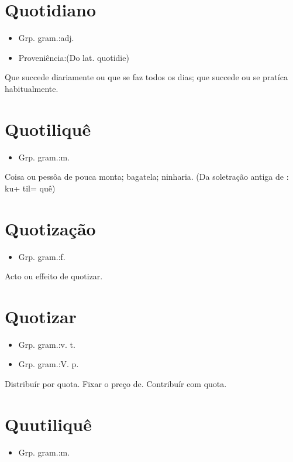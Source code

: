 \section{Quotidiano}
\begin{itemize}
\item {Grp. gram.:adj.}
\end{itemize}
\begin{itemize}
\item {Proveniência:(Do lat. \textunderscore quotidie\textunderscore )}
\end{itemize}
Que succede diariamente ou que se faz todos os dias; que succede ou se pratíca habitualmente.
\section{Quotiliquê}
\begin{itemize}
\item {Grp. gram.:m.}
\end{itemize}
Coisa ou pessôa de pouca monta; bagatela; ninharia.
(Da soletração antiga de \textunderscore [~q]\textunderscore : \textunderscore ku\textunderscore  + \textunderscore til\textunderscore  = \textunderscore quê\textunderscore )
\section{Quotização}
\begin{itemize}
\item {Grp. gram.:f.}
\end{itemize}
Acto ou effeito de quotizar.
\section{Quotizar}
\begin{itemize}
\item {Grp. gram.:v. t.}
\end{itemize}
\begin{itemize}
\item {Grp. gram.:V. p.}
\end{itemize}
Distribuír por quota.
Fixar o preço de.
Contribuír com quota.
\section{Quutiliquê}
\begin{itemize}
\item {Grp. gram.:m.}
\end{itemize}
